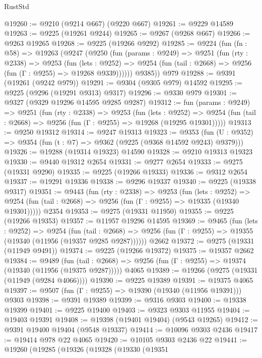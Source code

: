 \begin{lexlean}{RustStd}
\begin{coremodule}
@19260 := @9210 (@9214 @667) (@9220 @667)
@19261 := @9229 @14589
@19263 := @9225 (@19261 @9244)
@19265 := @9267 (@9268 @667)
@19266 := @9263 @19265
@19268 := @9225 (@19266 @9292)
@19285 := @9224
    (fun (fn : @58) =>
    @19263
      (@9247
        (@9250
          (fun (params : @9249) =>
          @9251
            (fun (rty : @2338) =>
            @9253
              (fun (lets : @9252) =>
              @9254 (fun (tail : @2668) => @9256 (fun (Γ : @9255) => @19268 @9339))))))
        @9385))
    @979
@19288 := @9391 (@19261 (@9242 @979))
@19291 := @9304 (@9305 @979) @14592
@19295 := @9225 (@9296 (@19291 @9313) @9317)
@19296 := @9330 @979
@19301 := @9327 (@9329 @19296 @14595 @9285 @9287)
@19312 := fun (params : @9249) =>
  @9251
    (fun (rty : @2338) =>
    @9253
      (fun (lets : @9252) =>
      @9254 (fun (tail : @2668) => @9256 (fun (Γ : @9255) => @19268 (@19295 @19301)))))
@19313 := @9250 @19312
@19314 := @9247 @19313
@19323 := @9353
    (fun (U : @9352) => @9354 (fun (t : @7) => @9362 (@9225 (@9368 @14592 @9243) @9379)))
@19326 := @19288 (@19314 @19323) @14590
@19328 := @9210 @19313 @19323
@19330 := @9440 @19312 @2654
@19331 := @9277 @2654
@19333 := @9275 (@19331 @9290)
@19335 := @9225 (@19266 @19333)
@19336 := @9312 @2654
@19337 := @19291 @19336
@19338 := @9296 @19337
@19340 := @9225 (@19338 @9317)
@19351 := @9443
    (fun (rty : @2338) =>
    @9253
      (fun (lets : @9252) =>
      @9254 (fun (tail : @2668) => @9256 (fun (Γ : @9255) => @19335 (@19340 @19301)))))
    @2354
@19353 := @9275 (@19331 @11950)
@19355 := @9225 (@19266 @19353)
@19357 := @11957 @19296 @14595
@19369 := @9465
    (fun (lets : @9252) =>
    @9254
      (fun (tail : @2668) =>
      @9256 (fun (Γ : @9255) => @19355 (@19340 (@11956 (@19357 @9285 @9287))))))
    @2662
@19372 := @9275 (@19331 (@11949 @9491))
@19374 := @9225 (@19266 @19372)
@19375 := @19357 @2662
@19384 := @9489
    (fun (tail : @2668) => @9256 (fun (Γ : @9255) => @19374 (@19340 (@11956 (@19375 @9287)))))
    @4065
@19389 := @19266 (@9275 (@19331 (@11949 (@9284 @4066))))
@19390 := @9225 @19389
@19391 := @19375 @4065
@19397 := @9507 (fun (Γ : @9255) => @19390 (@19340 (@11956 @19391))) @9303
@19398 := @9391 @19389
@19399 := @9316 @9303
@19400 := @19338 @19399
@19401 := @9225 @19400
@19403 := @9323 @9303 @11955
@19404 := @19403 @19391
@19408 := @19398 (@19401 @19404) (@9543 @19265)
@19412 := @9391 @19400 @19404 (@9548 @19337)
@19414 := @10096 @9303 @2436
@19417 := @19414 @978 @22 @4065
@19420 := @10105 @9303 @2436 @22
@19441 := @19260
    (@19285
      (@19326
        (@19328
          (@19330
            (@19351

\end{coremodule}
\end{lexlean}
